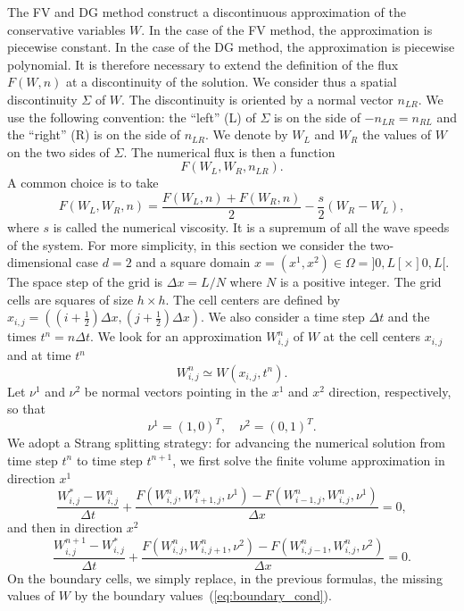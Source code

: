 \documentclass[preprint]{sig-alternate}
\begin{document}
The FV and DG method construct a discontinuous approximation of the conservative variables $W$. In the case of the FV method, the approximation is piecewise constant. In the case of the DG method, the approximation is piecewise polynomial. It is therefore necessary to extend the definition of the flux $F(W,n)$ at a discontinuity of the solution. We consider thus a spatial discontinuity $\Sigma$ of $W$. The discontinuity is oriented by a normal vector $n_{LR}$. We use the following convention: the ``left'' (L) of $\Sigma$ is on the side of $-n_{LR}=n_{RL}$ and the ``right'' (R) is on the side of $n_{LR}$. We denote by $W_L$ and $W_R$ the values of $W$ on the two sides of $\Sigma$. The numerical flux is then a function $$F(W_L,W_R,n_{LR}).$$
A common choice is to take
\begin{equation*}
F(W_L,W_R,n)=\frac{F(W_L,n)+F(W_R,n)}{2}-\frac{s}{2}(W_R-W_L),
\end{equation*}
where $s$ is called the numerical viscosity. It is a supremum of all the wave speeds of the system.
For more simplicity, in this section we consider the two-dimensional case $d=2$ and a square domain $x=(x^1,x^2)\in \Omega=]0,L[\times]0,L[$. The space step of the grid is $\Delta x=L/N$ where $N$ is a positive integer. The grid cells are squares of size $h\times h$. The cell centers are defined by $x_{i,j}=((i+\frac{1}{2})\Delta x,(j+\frac{1}{2})\Delta x)$. We also consider a time step $\Delta t$ and the times $t^n=n\Delta t$. We look for an approximation $W^n_{i,j}$ of $W$  at the cell centers $x_{i,j}$ and at time $t^n$
\begin{equation}
W^n_{i,j}\simeq W(x_{i,j},t^n).
\end{equation}
Let $\nu^1$ and $\nu^2$ be normal vectors pointing in the $x^1$ and $x^2$ direction, respectively, so that
$$
\nu^1=(1,0)^T,\quad \nu^2=(0,1)^T.
$$
We adopt a Strang splitting strategy: for advancing the numerical solution from time step $t^n$ to time step $t^{n+1}$, we first solve the finite volume approximation in direction $x^1$
\begin{equation}
\frac{W_{i,j}^{*}-W_{i,j}^{n}}{\Delta t}+\frac{F(W^n_{i,j},W^n_{i+1,j},\nu^1)-F(W^n_{i-1,j},W^n_{i,j},\nu^1)}{\Delta x}=0,
\label{eq:x-step}
\end{equation}
and then in direction $x^2$
\begin{equation}
\frac{W_{i,j}^{n+1}-W_{i,j}^{*}}{\Delta t}+\frac{F(W^n_{i,j},W^n_{i,j+1},\nu^2)-F(W^n_{i,j-1},W^n_{i,j},\nu^2)}{\Delta x}=0.
\label{eq:y-step}
\end{equation}
On the boundary cells, we simply replace, in the previous formulas, the missing values of $W$ by the boundary values~(\ref{eq:boundary_cond}).
\end{document}
